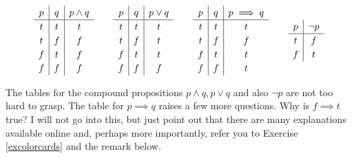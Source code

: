 \documentclass{article}
\begin{document}
\begin{equation*}[emph]
\def\arraystretch{1.2}
      \begin{array}{c|c|c}
        p & q  & p\land q  \\
        \hline 
        t & t  & t    \\
        t & f & f\\
        f & t & f\\
        f & f & f
      \end{array}\qquad
      \begin{array}{c|c|c}
        p & q  & p\lor q  \\
        \hline
        t & t  & t    \\
        t & f & t\\
        f & t & t\\
        f & f & f
      \end{array}
      \qquad
      \begin{array}{c|c|c}
        p & q  & p\implies q  \\
        \hline
        t & t  & t    \\
        t & f & f\\
        f & t & t\\
        f & f & t
      \end{array}\qquad
      \begin{array}{c|c}
        p & \neg p \\
        \hline
        t & f\\
        f & t
      \end{array}
  \end{equation*}


The tables for the compound propositions $p\land q, p\lor q$ and also
$\neg p$ are not too hard to grasp. The table for $p\implies q$ 
raises a few more questions. Why is $f\implies t$ true?
I will not go into this, but just point out that there are
many explanations available online and, 
perhaps more importantly, refer you to Exercise \ref{excolorcards} and the remark below.
\end{document}
